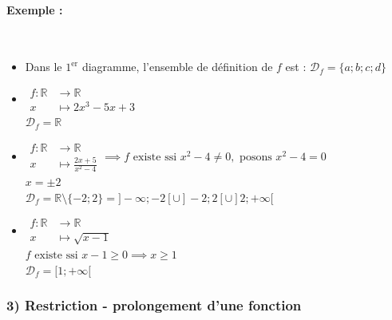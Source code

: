 \documentclass[12pt,a4paper]{article}
\begin{document}
\paragraph{Exemple : \hrulefill}~\\
\begin{itemize}
    \item[$\bullet$] Dans le $1^{\text{er}}$ diagramme, l'ensemble de définition de $f$ est : $\boxed{\mathcal{D}_f = \{a ; b ; c ; d\}}$
    
    \item[$\bullet$] $\begin{aligned} f : \mathbb{R} &\rightarrow \mathbb{R} \\ x &\mapsto 2x^3 - 5x + 3 \end{aligned}$ \\
    {\color{darkred}$\mathcal{D}_f = \mathbb{R}$}
    
    \item[$\bullet$] $\begin{aligned} f : \mathbb{R} &\rightarrow \mathbb{R} \\ x &\mapsto \frac{2x+5}{x^2-4} \end{aligned} \implies f \text{ existe ssi } x^2-4 \neq 0, \text{ posons } x^2-4 = 0$ \\
     $x = \pm 2$ \\
    {\color{darkred}$\mathcal{D}_f = \mathbb{R} \setminus \{-2 ; 2\} = ]-\infty ; -2[ \cup ]-2 ; 2[ \cup ]2 ; +\infty[$}
    
    \item[$\bullet$] $\begin{aligned} f : \mathbb{R} &\rightarrow \mathbb{R} \\ x &\mapsto \sqrt{x-1} \end{aligned}$ \\
    $f \text{ existe ssi } x-1 \geq 0 \implies x \geq 1$ \\
    {\color{darkred}$\mathcal{D}_f = [1 ; +\infty[$}
\end{itemize}

\subsubsection*{\color{darkgreen} 3) Restriction - prolongement d'une fonction}
\end{document}
